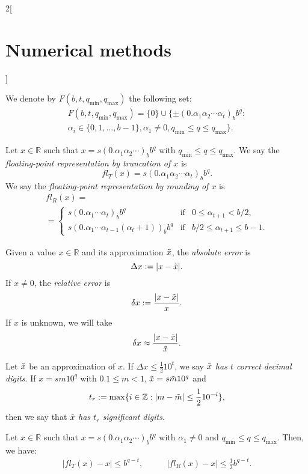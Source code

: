 \documentclass[class=article,10pt,crop=false]{standalone}
\begin{document}
\begin{multicols}{2}[\section{Numerical methods}]
\begin{table}[ht]
\end{table}
\begin{definition}
We denote by $F(b,t,q_\text{min},q_\text{max})$ the following set:
\begin{multline*}
    F(b,t,q_\text{min},q_\text{max})=\{0\}\cup\{\pm(0.\alpha_1\alpha_2\cdots\alpha_t)_bb^q:\\\alpha_i\in\{0,1,\ldots,b-1\},\alpha_1\ne0, q_\text{min}\leq q\leq q_\text{max}\}.
\end{multline*}
\end{definition}
\begin{definition}
Let $x\in\mathbb{R}$ such that $x=s(0.\alpha_1\alpha_2\cdots)_bb^q$ with $q_\text{min}\leq q\leq q_\text{max}$. We say the \textit{floating-point representation by truncation of $x$} is $$fl_T(x)=s(0.\alpha_1\alpha_2\cdots\alpha_t)_bb^q.$$ We say the \textit{floating-point representation by rounding of $x$} is \begin{multline*}
fl_R(x)=\\=\left\{\begin{array}{lcl}
        s(0.\alpha_1\cdots\alpha_t)_bb^q & \text{if} & 0\leq\alpha_{t+1}<b/2,\\
        s(0.\alpha_1\cdots\alpha_{t-1}(\alpha_t+1))_bb^q & \text{if} & b/2\leq\alpha_{t+1}\leq b-1.
    \end{array}\right.
\end{multline*}
\end{definition}
\begin{definition}
Given a value $x\in\mathbb{R}$ and its approximation $\Tilde{x}$, the \textit{absolute error} is $$\Delta x:=|x-\Tilde{x}|.$$ If $x\ne 0$, the \textit{relative error} is $$\delta x:=\frac{|x-\Tilde{x}|}{x}.$$ If $x$ is unknown, we will take $$\delta x\approx\frac{|x-\Tilde{x}|}{\Tilde{x}}.$$
\end{definition}
\begin{definition}
Let $\Tilde{x}$ be an approximation of $x$. If $\Delta x\leq\frac{1}{2}10^t$, we say \textit{$\Tilde{x}$ has $t$ correct decimal digits}. If $x=sm10^q$ with $0.1\leq m<1$, $\Tilde{x}=s\Tilde{m}10^q$ and $$t_r:=\max\{i\in\mathbb{Z}:|m-\Tilde{m}|\leq\frac{1}{2}10^{-i}\},$$ then we say that $\Tilde{x}$ \textit{has $t_r$ significant digits}.
\end{definition}
Let $x\in\mathbb{R}$ such that $x=s(0.\alpha_1\alpha_2\cdots)_bb^q$ with $\alpha_1\ne0$ and $q_\text{min}\leq q\leq q_\text{max}$. Then, we have:
\begin{align*}
    \left|fl_T(x)-x\right|\leq b^{q-t},\quad&\quad \left|fl_R(x)-x\right|\leq\frac{1}{2}b^{q-t}.\\

\end{align*}
\end{multicols}
\end{document}
